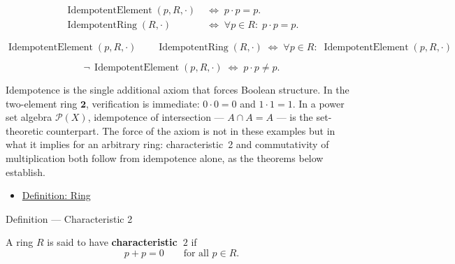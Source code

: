 \begin{remark*}
\[
\begin{aligned}
\operatorname{IdempotentElement}(p, R, \cdot)
&\;\Longleftrightarrow\; p \cdot p = p. \\[4pt]
\operatorname{IdempotentRing}(R, \cdot)
&\;\Longleftrightarrow\; \forall p \in R{:}\; p \cdot p = p.
\end{aligned}
\]
\end{remark*}

\begin{remark*}
\[
\operatorname{IdempotentElement}(p,R,\cdot)
\qquad
\operatorname{IdempotentRing}(R,\cdot)
\;\Longleftrightarrow\;
\forall p \in R{:}\;
\operatorname{IdempotentElement}(p,R,\cdot)
\]
\end{remark*}

\begin{remark*}
\[
\neg\,\operatorname{IdempotentElement}(p,R,\cdot)
\;\Longleftrightarrow\;
p \cdot p \neq p.
\]
\end{remark*}

\begin{remark*}[Interpretation]
Idempotence is the single additional axiom that forces Boolean
structure.  In the two-element ring $\mathbf{2}$, verification is
immediate: $0 \cdot 0 = 0$ and $1 \cdot 1 = 1$.  In a power set
algebra $\mathcal{P}(X)$, idempotence of intersection --- $A \cap A
= A$ --- is the set-theoretic counterpart.  The force of the axiom
is not in these examples but in what it implies for an arbitrary
ring: characteristic~2 and commutativity of multiplication both
follow from idempotence alone, as the theorems below establish.
\end{remark*}

\begin{dependencies}
\begin{itemize}
  \item \hyperref[def:algebraic-ring]{Definition: Ring}
\end{itemize}
\end{dependencies}


\begin{definitionbox}{Definition --- Characteristic 2}
\begin{definition}[Characteristic 2]
\label{def:characteristic-2}
A ring $R$ is said to have \textbf{characteristic~$2$} if
\[
p + p = 0 \qquad \text{for all } p \in R. \tag{10}
\]
\end{definition}
\end{definitionbox}

